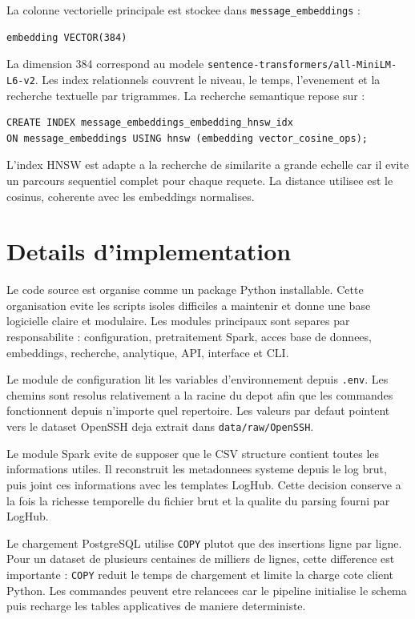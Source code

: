 \documentclass[12pt,a4paper]{article}
\begin{document}
La colonne vectorielle principale est stockee dans \texttt{message\_embeddings} :

\begin{lstlisting}
embedding VECTOR(384)
\end{lstlisting}

La dimension 384 correspond au modele \texttt{sentence-transformers/all-MiniLM-L6-v2}. Les index
relationnels couvrent le niveau, le temps, l'evenement et la recherche textuelle par trigrammes. La
recherche semantique repose sur :

\begin{lstlisting}
CREATE INDEX message_embeddings_embedding_hnsw_idx
ON message_embeddings USING hnsw (embedding vector_cosine_ops);
\end{lstlisting}

L'index HNSW est adapte a la recherche de similarite a grande echelle car il evite un parcours
sequentiel complet pour chaque requete. La distance utilisee est le cosinus, coherente avec les
embeddings normalises.

\section{Details d'implementation}

Le code source est organise comme un package Python installable. Cette organisation evite les
scripts isoles difficiles a maintenir et donne une base logicielle claire et modulaire. Les
modules principaux sont separes par responsabilite : configuration, pretraitement Spark, acces base
de donnees, embeddings, recherche, analytique, API, interface et CLI.

Le module de configuration lit les variables d'environnement depuis \texttt{.env}. Les chemins sont
resolus relativement a la racine du depot afin que les commandes fonctionnent depuis n'importe quel
repertoire. Les valeurs par defaut pointent vers le dataset OpenSSH deja extrait dans
\texttt{data/raw/OpenSSH}.

Le module Spark evite de supposer que le CSV structure contient toutes les informations utiles. Il
reconstruit les metadonnees systeme depuis le log brut, puis joint ces informations avec les
templates LogHub. Cette decision conserve a la fois la richesse temporelle du fichier brut et la
qualite du parsing fourni par LogHub.

Le chargement PostgreSQL utilise \texttt{COPY} plutot que des insertions ligne par ligne. Pour un
dataset de plusieurs centaines de milliers de lignes, cette difference est importante : \texttt{COPY}
reduit le temps de chargement et limite la charge cote client Python. Les commandes peuvent etre
relancees car le pipeline initialise le schema puis recharge les tables applicatives de maniere
deterministe.
\end{document}
